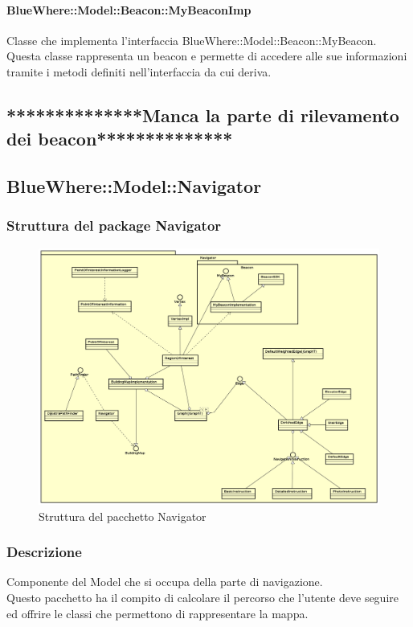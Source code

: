 \documentclass[../SpecificaTecnica.tex]{subfiles}
\begin{document}
			\paragraph{BlueWhere::Model::Beacon::MyBeaconImp}
				Classe che implementa l'interfaccia BlueWhere::Model::Beacon::MyBeacon. \\
				Questa classe rappresenta un beacon e permette di accedere alle sue informazioni tramite i metodi definiti nell'interfaccia da cui deriva.
	\subsection{**************Manca la parte di rilevamento dei beacon**************}
	\newpage
	\subsection{BlueWhere::Model::Navigator}
		\subsubsection{Struttura del package Navigator}
		\begin{figure}[!h]
			\centering
			\includegraphics[scale=0.3]{diagrammi/Navigator.png}
				\caption{Struttura del pacchetto Navigator}
			\label{fig:Struttura_MVP}
		\end{figure} 
		\subsubsection{Descrizione}
			Componente del Model che si occupa della parte di navigazione. \\
			Questo pacchetto ha il compito di calcolare il percorso che l'utente deve seguire ed offrire le classi che permettono di rappresentare la mappa.
\end{document}
